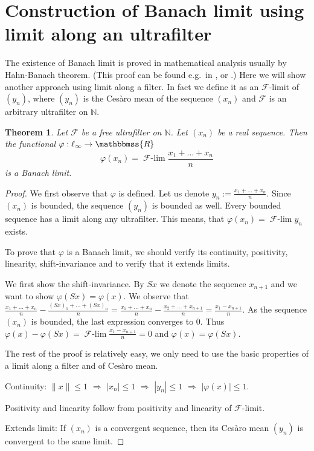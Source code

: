 \documentclass[12pt]{article}
\newcommand{\N}[0]{\mathbb{N}}
\newcommand{\R}{\mathbbmss{R}}
\newcommand*{\norm}[1]{\lVert #1 \rVert}
\newcommand*{\abs}[1]{| #1 |}
\newcommand{\Map}[3]{#1:#2\to#3}
\newcommand{\vp}{\varphi}
\newcommand{\Ra}{\Rightarrow}
\newcommand{\mc}{\mathcal}
\newtheorem{THM}{Theorem}
\newcommand{\F}{\mc F}
\newcommand{\Flim}{\operatorname{\F\text{-}\lim}}
\begin{document}
\section*{Construction of Banach limit using limit along an ultrafilter}

The existence of Banach limit is proved in mathematical analysis
usually by Hahn-Banach theorem. (This proof can be found e.g.~in
\cite{swartz}, \cite{costarapopa} or \cite{morisson}.) Here we
will show another approach using limit along a filter. In fact we
define it as an $\F$-limit of $(y_n)$, where $(y_n)$ is the
Ces\`aro mean of the sequence $(x_n)$ and $\F$ is an arbitrary
ultrafilter on $\N$.

\begin{THM}
Let $\F$ be a free ultrafilter on $\N$. Let $(x_n)$ be a  real
sequence. Then the functional $\Map\vp{\ell_\infty}{\R}$
$$\vp(x_n)=\Flim \frac{x_1+\ldots+x_n}n$$
is a Banach limit.
\end{THM}

\begin{proof}
We first observe that $\vp$ is defined. Let us denote
$y_n:=\frac{x_1+\ldots+x_n}n$. Since $(x_n)$ is bounded, the
sequence $(y_n)$ is bounded as well. Every bounded sequence has a
limit along any ultrafilter. This means, that $\vp(x_n)=\Flim y_n$
exists.

To prove that $\vp$ is a Banach limit, we should verify its
continuity, positivity, linearity, shift-invariance and to verify
that it extends limits.

We first show the shift-invariance. By $Sx$ we denote the sequence
$x_{n+1}$ and we want to show $\vp(Sx)=\vp(x)$. We observe that
$\frac{x_1+\ldots+x_n}n - \frac{(Sx)_1+\ldots+(Sx)_n}n =
\frac{x_1+\ldots+x_n}n - \frac{x_2+\ldots+x_{n+1}}n=
\frac{x_1-x_{n+1}}n$. As the sequence $(x_n)$ is bounded, the last
expression converges to 0. Thus $\vp(x)-\vp(Sx)=\Flim
\frac{x_1-x_{n+1}}n =0$ and $\vp(x)=\vp(Sx)$.

The rest of the proof is relatively easy, we only need to use the
basic properties of a limit along a filter and of Ces\`aro mean.

Continuity: $\norm x \leq 1$ $\Ra$ $\abs{x_n}\leq 1$ $\Ra$
$\abs{y_n} \leq 1$ $\Ra$ $\abs{\vp(x)}\leq 1$.

Positivity and linearity follow from positivity and linearity of
$\F$-limit.

Extends limit: If $(x_n)$ is a convergent sequence, then its
Ces\`aro mean $(y_n)$ is convergent to the same limit.
\end{proof}
\end{document}
